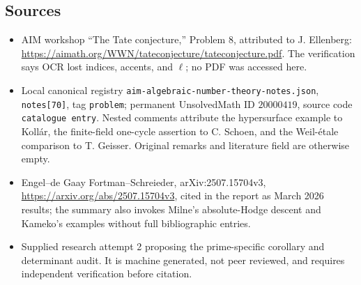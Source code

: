 \documentclass[11pt]{article}
\begin{document}
\subsection{Sources}
\begin{itemize}
\item AIM workshop ``The Tate conjecture,'' Problem 8, attributed to J. Ellenberg: \url{https://aimath.org/WWN/tateconjecture/tateconjecture.pdf}. The verification says OCR lost indices, accents, and \(\ell\); no PDF was accessed here.
\item Local canonical registry \texttt{aim-algebraic-number-theory-notes.json}, \texttt{notes[70]}, tag \texttt{problem}; permanent UnsolvedMath ID \(20000419\), source code \texttt{catalogue entry}. Nested comments attribute the hypersurface example to Koll\'ar, the finite-field one-cycle assertion to C. Schoen, and the Weil-\'etale comparison to T. Geisser. Original remarks and literature field are otherwise empty.
\item Engel--de Gaay Fortman--Schreieder, arXiv:2507.15704v3, \url{https://arxiv.org/abs/2507.15704v3}, cited in the report as March 2026 results; the summary also invokes Milne's absolute-Hodge descent and Kameko's examples without full bibliographic entries.
\item Supplied research attempt 2 proposing the prime-specific corollary and determinant audit. It is machine generated, not peer reviewed, and requires independent verification before citation.
\end{itemize}
\end{document}
